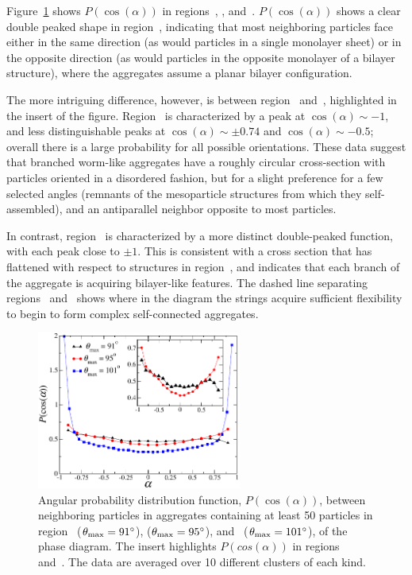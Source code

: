 Figure~\ref{fig:p_of_alpha} shows  $P(\cos(\alpha))$ in regions~, , and~.
$P(\cos(\alpha))$ shows a clear double peaked shape in region~, indicating that most neighboring particles face either in the same direction (as would particles in a single monolayer sheet) or in the opposite direction (as would particles in the opposite monolayer of a bilayer structure), where the aggregates assume a planar bilayer configuration.

The more intriguing difference, however, is between region~ and~, highlighted in the insert of the figure. 
Region~ is characterized by a peak at $\cos(\alpha)\sim -1$, and less distinguishable peaks at $\cos(\alpha)\sim \pm 0.74$ and  $\cos(\alpha)\sim -0.5$; overall there is a large probability for all possible orientations.
These data suggest that  branched worm-like aggregates have a roughly circular cross-section with particles oriented in a disordered fashion, but for a slight preference for a few selected angles (remnants of the mesoparticle structures from which they self-assembled), and an antiparallel neighbor opposite to most particles.

In contrast, region~ is characterized by a more distinct double-peaked function, with each peak close to $\pm 1$. 
This is consistent with a cross section that has flattened with respect to structures in region~, and indicates that each branch of the aggregate is acquiring bilayer-like features.
The dashed line separating regions~ and~ shows where in the diagram the strings acquire sufficient flexibility to begin to form complex self-connected aggregates.   
\begin{figure}
	\begin{center}\includegraphics[width=0.6\textwidth]{janus/p_of_alpha}\end{center}
	\caption[Angular probability distribution function between neighboring particles]{Angular probability distribution function, $P(\cos(\alpha))$, between neighboring particles in  aggregates 	
	 containing at least 50 particles in region~ ($\theta_{\rm max}=91^{\circ}$), 
	  ($\theta_{\rm max}=95^{\circ}$), and~ ($\theta_{\rm max}=101^{\circ}$), 
	 of the phase diagram. The insert highlights $P(cos(\alpha))$ 
	 in regions~ and~. The data are averaged over 10 different clusters of each kind.}
	\label{fig:p_of_alpha}
\end{figure}

